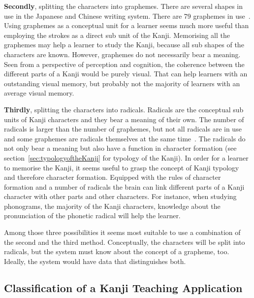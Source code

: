\textbf{Secondly}, splitting the characters into graphemes. There are several 
shapes in use in the Japanese and Chinese writing system. There are 79 
graphemes in use~.
Using graphemes as a conceptual unit for a learner seems much more useful than
employing the strokes as a direct sub unit of the Kanji.
Memorising all the graphemes may help a learner to study the Kanji, because all 
sub shapes of the characters are known. However, graphemes do not necessarily 
bear a meaning. Seen from a perspective of perception and cognition, 
the coherence between the different parts of a Kanji would be purely visual.
That can help learners with an outstanding visual memory, but probably not
the majority of learners with an average visual memory.

\textbf{Thirdly}, splitting the characters into radicals. Radicals are the 
conceptual sub units of Kanji characters and they bear a meaning of their 
own. The number of radicals is larger than the number of graphemes, but not all 
radicals are in use and some graphemes are radicals themselves at the same 
time~.
The radicals do not only bear a meaning but also have a function in character
formation (see section~\ref{sec:typologyoftheKanji} for typology of the Kanji).
In order for a learner to memorise the Kanji, it seems useful to grasp the 
concept of Kanji typology and therefore character formation.
Equipped with the rules of character formation and a number of radicals the
brain can link different parts of a Kanji character with other parts and 
other characters. For instance, when studying phonograms, the majority of the
Kanji characters, knowledge about the pronunciation of the phonetic radical
will help the learner.

Among those three possibilities it seems most suitable to use a combination of 
the second and the third method. Conceptually, the characters will be split into 
radicals, but the system must know about the concept of a grapheme, too.
Ideally, the system would have data that distinguishes both.

\subsection{Classification of a Kanji Teaching Application}
\label{sec:concept:classificationofaKanjiteachingapplication}


